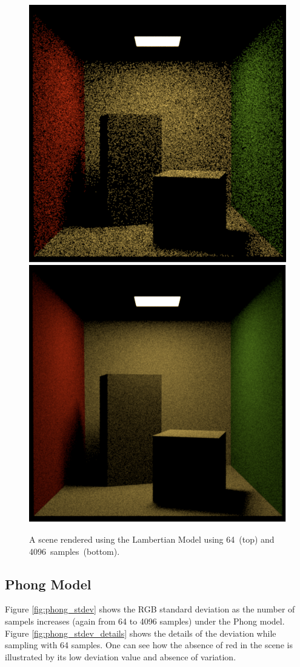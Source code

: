 \documentclass{article}
\begin{document}
\begin{figure}[p]
\centering
\includegraphics[width=.75\textwidth]{assets/lamb64}
\\
\includegraphics[width=.75\textwidth]{assets/lamb1024}

\caption{A scene rendered using the Lambertian Model using 64~(top) and 4096~samples~(bottom).}
\end{figure}


\subsection*{Phong Model}
Figure \ref{fig:phong_stdev} shows the RGB standard deviation as the number of sampels increases (again from 64 to 4096 samples) under the Phong model. Figure \ref{fig:phong_stdev_details} shows the details of the deviation while sampling with 64 samples. One can see how the absence of red in the scene is illustrated by its low deviation value and absence of variation.
\end{document}
